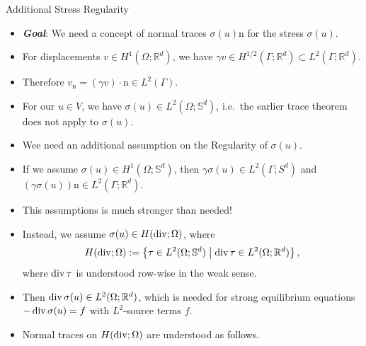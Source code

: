 \documentclass[10pt,aspectratio=169]{beamer}
\def\R{{\mathbb R}}
\def\S{{\mathbb S}}
\newcommand{\diver}{\operatornamewithlimits{div}}
\begin{document}
\begin{frame}{Additional Stress Regularity}
	\begin{itemize}
		\item \textbf{\em Goal}: We need a concept of normal traces $\sigma(u)\mathrm{n}$ for the stress $\sigma(u)$.
		\item For displacements $v\in H^1(\Omega;\R^d)$, we have $\gamma v\in H^{1/2}(\Gamma;\R^d)\subset L^2(\Gamma;\R^d)$.
		\item Therefore $v_\mathrm{n} = (\gamma v)\cdot \mathrm{n} \in L^2(\Gamma)$.
		\item For our $u\in V$, we have $\sigma(u)\in L^2(\Omega;\S^d)$, i.e.\ the earlier trace theorem does not apply to $\sigma(u)$.
		\item Wee need an additional assumption on the Regularity of $\sigma(u)$.
		\item If we assume $\sigma(u)\in H^1(\Omega;\S^d)$, then $\gamma\sigma(u)\in L^2(\Gamma;S^d)$ and $(\gamma\sigma(u))\mathrm{n}\in L^2(\Gamma;\R^d)$.
		\item This assumptions is much stronger than needed!
		\item Instead, we assume $\sigma(u)\in H(\diver;\Omega)$, where
		      \begin{equation*}
			      H(\diver;\Omega):= \left\{\tau\in L^2(\Omega;\S^d)\;\middle|\;\diver\tau\in L^2(\Omega;\R^d)\right\},
		      \end{equation*}
		      where $\diver \tau$ is understood row-wise in the weak sense.
		\item Then $\diver\sigma(u)\in L^2(\Omega;\R^d)$, which is needed for strong equilibrium equations $-\diver\sigma(u) = f$ with $L^2$-source terms $f$.
		\item Normal traces on $H(\diver;\Omega)$ are understood as follows.
	\end{itemize}
\end{frame}
\end{document}
